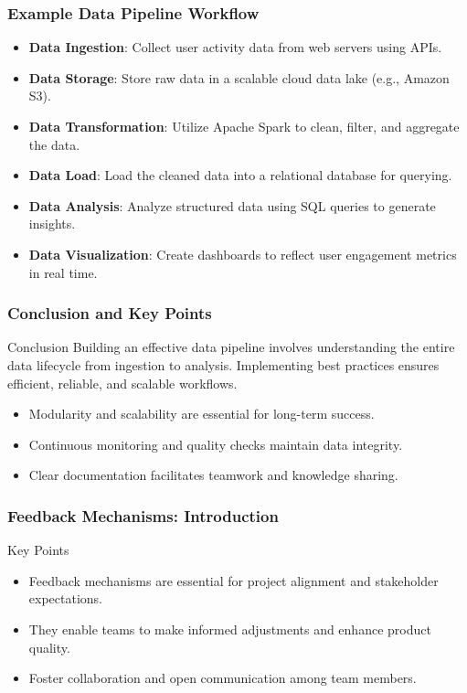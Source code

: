 \documentclass[aspectratio=169]{beamer}
\begin{document}
\begin{frame}[fragile]
    \frametitle{Example Data Pipeline Workflow}
    \begin{itemize}
        \item \textbf{Data Ingestion}: Collect user activity data from web servers using APIs.
        \item \textbf{Data Storage}: Store raw data in a scalable cloud data lake (e.g., Amazon S3).
        \item \textbf{Data Transformation}: Utilize Apache Spark to clean, filter, and aggregate the data.
        \item \textbf{Data Load}: Load the cleaned data into a relational database for querying.
        \item \textbf{Data Analysis}: Analyze structured data using SQL queries to generate insights.
        \item \textbf{Data Visualization}: Create dashboards to reflect user engagement metrics in real time.
    \end{itemize}
\end{frame}

\begin{frame}[fragile]
    \frametitle{Conclusion and Key Points}
    \begin{block}{Conclusion}
        Building an effective data pipeline involves understanding the entire data lifecycle from ingestion to analysis. Implementing best practices ensures efficient, reliable, and scalable workflows.
    \end{block}
    
    \begin{itemize}
        \item Modularity and scalability are essential for long-term success.
        \item Continuous monitoring and quality checks maintain data integrity.
        \item Clear documentation facilitates teamwork and knowledge sharing.
    \end{itemize}
\end{frame}

\begin{frame}[fragile]
    \frametitle{Feedback Mechanisms: Introduction}
    \begin{block}{Key Points}
        \begin{itemize}
            \item Feedback mechanisms are essential for project alignment and stakeholder expectations.
            \item They enable teams to make informed adjustments and enhance product quality.
            \item Foster collaboration and open communication among team members.
        \end{itemize}
    \end{block}
\end{frame}
\end{document}
